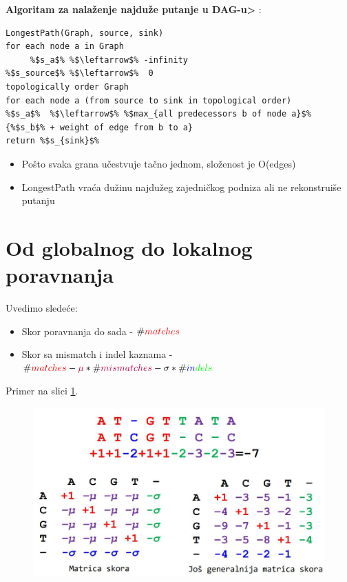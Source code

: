 \textbf{Algoritam za nalaženje najduže putanje u DAG-u>} :

\begin{lstlisting}
LongestPath(Graph, source, sink)
for each node a in Graph
     %$s_a$% %$\leftarrow$% -infinity
%$s_source$% %$\leftarrow$%  0
topologically order Graph
for each node a (from source to sink in topological order)
%$s_a$%  %$\leftarrow$% %$max_{all predecessors b of node a}$% {%$s_b$% + weight of edge from b to a}
return %$s_{sink}$%
\end{lstlisting}


\begin{itemize}
    \item Pošto svaka grana učestvuje tačno jednom, složenost je O(edges)
    \item LongestPath vraća dužinu najdužeg zajedničkog podniza ali ne rekonstruiše putanju
\end{itemize}


\section{Od globalnog do lokalnog poravnanja}

Uvedimo sledeće:
\begin{itemize}
    \item Skor poravnanja do sada - $\#\textcolor{red}{matches}$ \\
    \item Skor sa mismatch i indel kaznama - $\#\textcolor{red}{matches} - \textcolor{purple}{\mu} * \#\textcolor{purple}{mismatches} - \sigma * \#\textcolor{blue}{in}\textcolor{green}{dels}$ \\
\end{itemize}

Primer na slici \ref{slika:matriceSkora}. \\

\begin{figure}[h]
\centering
\includegraphics[width=\textwidth]{poglavlja/5/slike/matriceSkora.JPG}
\caption{}
\label{slika:matriceSkora}
\end{figure}


